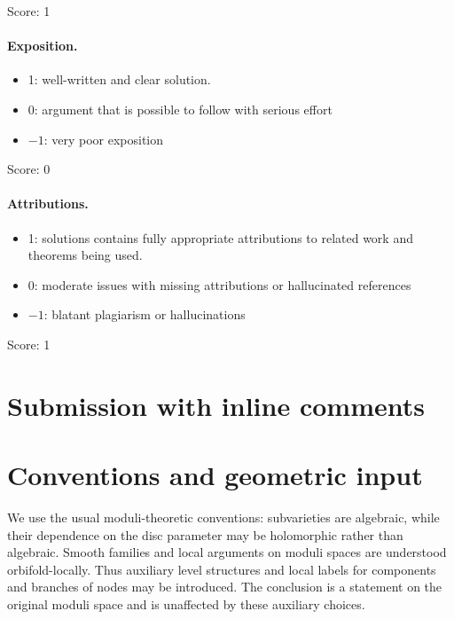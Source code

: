 \documentclass[11pt]{article}
\theoremstyle{remark}
\begin{document}
\noindent Score: 1

\paragraph{Exposition.}
\begin{itemize}
	\item  1: well-written and clear solution.
	\item  0: argument that is possible to follow with serious effort
	\item  $-1$: very poor exposition
\end{itemize}

\noindent Score: 0

\paragraph{Attributions.}
\begin{itemize}
	\item  1: solutions contains fully appropriate attributions
		to related work and theorems being used.
	\item  0: moderate issues with missing attributions or hallucinated references
	\item  $-1$: blatant plagiarism or hallucinations
\end{itemize}

\noindent Score: 1

\newpage
\section{Submission with inline comments}


\begin{abstract}
We prove the asserted constancy using rigidity of Teichm\"uller curves
and the boundary structure theorem for totally geodesic subvarieties.
An important preliminary observation is that the compatibility
hypothesis forces every positive-dimensional boundary locus in a
stratum with at least two nodes to remain fixed set-theoretically.
This observation also handles the possibility that a cusp of one
boundary curve lies on another positive-dimensional boundary locus.
\end{abstract}

\section{Conventions and geometric input}

We use the usual moduli-theoretic conventions: subvarieties are
algebraic, while their dependence on the disc parameter may be
holomorphic rather than algebraic. Smooth families and local
arguments on moduli spaces are understood orbifold-locally.
Thus auxiliary level structures and local labels for components and
branches of nodes may be introduced. The conclusion is a statement
on the original moduli space and is unaffected by these auxiliary
choices.
\end{document}

